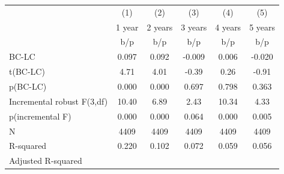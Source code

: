 {
\def\sym#1{\ifmmode^{#1}\else\(^{#1}\)\fi}
\begin{tabular}{l*{5}{c}}
\hline\hline
                    &\multicolumn{1}{c}{(1)}&\multicolumn{1}{c}{(2)}&\multicolumn{1}{c}{(3)}&\multicolumn{1}{c}{(4)}&\multicolumn{1}{c}{(5)}\\
                    &\multicolumn{1}{c}{1 year}&\multicolumn{1}{c}{2 years}&\multicolumn{1}{c}{3 years}&\multicolumn{1}{c}{4 years}&\multicolumn{1}{c}{5 years}\\
                    &         b/p   &         b/p   &         b/p   &         b/p   &         b/p   \\
\hline
\hline
BC-LC               &       0.097   &       0.092   &      -0.009   &       0.006   &      -0.020   \\
t(BC-LC)            &        4.71   &        4.01   &       -0.39   &        0.26   &       -0.91   \\
p(BC-LC)            &       0.000   &       0.000   &       0.697   &       0.798   &       0.363   \\
Incremental robust F(3,df)&       10.40   &        6.89   &        2.43   &       10.34   &        4.33   \\
p(incremental F)    &       0.000   &       0.000   &       0.064   &       0.000   &       0.005   \\
N                   &        4409   &        4409   &        4409   &        4409   &        4409   \\
R-squared           &       0.220   &       0.102   &       0.072   &       0.059   &       0.056   \\
Adjusted R-squared  &               &               &               &               &               \\
\hline\hline
\end{tabular}
}
